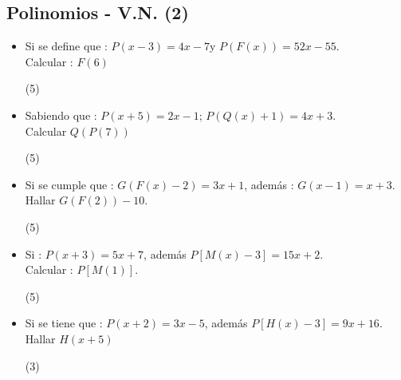 \documentclass[11pt, twocolumn, landscape, a4paper]{article}
\begin{document}
\subsection*{Polinomios - V.N. (2)}

\begin{itemize}
\item{Si se define que : \quad$P(x - 3) = 4x - 7$\quad y \quad$P(F(x)) = 52x - 55$. \\ Calcular : $F(6)$
\begin{tasks}(5)
\end{tasks}
}
\item{Sabiendo que : \quad$P(x + 5) = 2x - 1$; \quad$P(Q(x) + 1) = 4x + 3$. \\ Calcular $Q(P(7))$
\begin{tasks}(5)
\end{tasks}
}
\item{Si se cumple que : \quad$G(F(x) - 2) = 3x + 1$, \quad además : \quad$G(x - 1) = x + 3$. \\ Hallar $G(F(2)) - 10$.
\begin{tasks}(5)
\end{tasks}
}
\item{Si : \quad$P(x + 3) = 5x + 7$, \quad además \quad$P[M(x) - 3] = 15x + 2$. \\ Calcular : $P[M(1)]$.
\begin{tasks}(5)
\end{tasks}
}
\item{Si se tiene que : \quad$P(x + 2) = 3x - 5$, \quad además \quad$P[H(x) - 3] = 9x + 16$. \\ Hallar $H(x + 5)$
\begin{tasks}(3)
\end{tasks}
}
\end{itemize}
\end{document}
